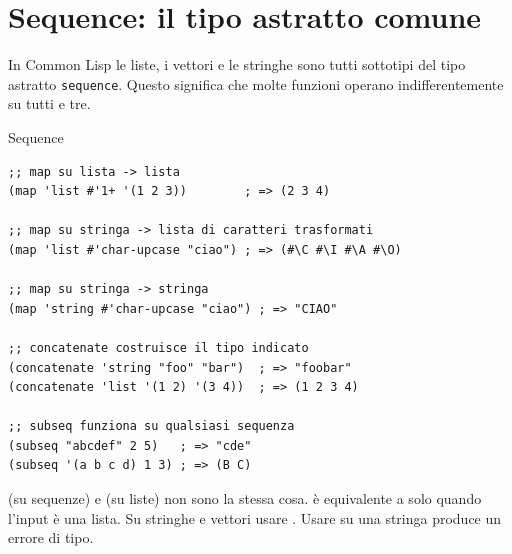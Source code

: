 \section{Sequence: il tipo astratto comune}

In Common Lisp le liste, i vettori e le stringhe sono tutti
sottotipi del tipo astratto \texttt{sequence}.
Questo significa che molte funzioni operano indifferentemente
su tutti e tre.

\begin{concetto}{Sequence}

\boxsep
{}
\end{concetto}

\begin{esempio}
\begin{lstlisting}
;; map su lista -> lista
(map 'list #'1+ '(1 2 3))        ; => (2 3 4)

;; map su stringa -> lista di caratteri trasformati
(map 'list #'char-upcase "ciao") ; => (#\C #\I #\A #\O)

;; map su stringa -> stringa
(map 'string #'char-upcase "ciao") ; => "CIAO"

;; concatenate costruisce il tipo indicato
(concatenate 'string "foo" "bar")  ; => "foobar"
(concatenate 'list '(1 2) '(3 4))  ; => (1 2 3 4)

;; subseq funziona su qualsiasi sequenza
(subseq "abcdef" 2 5)   ; => "cde"
(subseq '(a b c d) 1 3) ; => (B C)
\end{lstlisting}
\end{esempio}

\begin{attenzione}
 (su sequenze) e  (su liste) non sono la stessa cosa.
 è equivalente a  solo quando l'input
è una lista. Su stringhe e vettori usare .
Usare  su una stringa produce un errore di tipo.
\end{attenzione}

